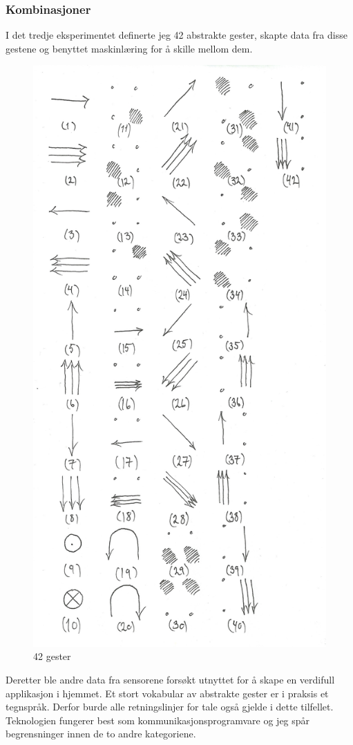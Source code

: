 \subsubsection*{Kombinasjoner}
I det tredje eksperimentet definerte jeg 42 abstrakte gester, skapte data fra disse gestene og benyttet maskinlæring for å skille mellom dem.\begin{figure}
\centering
\includegraphics[scale=0.2]{fig/42-gestures}
\caption{42 gester}
\label{fig:42}
\end{figure}Deretter ble andre data fra sensorene forsøkt utnyttet for å skape en verdifull applikasjon i hjemmet. Et stort vokabular av abstrakte gester er i praksis et tegnspråk. Derfor burde alle retningslinjer for tale også gjelde i dette tilfellet. Teknologien fungerer best som kommunikasjonsprogramvare og jeg spår begrensninger innen de to andre kategoriene.

